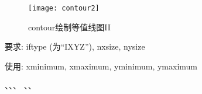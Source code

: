\begin{figure}[H]
\centering
\texttt{[image: contour2]}
\caption{contour绘制等值线图II}
\end{figure}

要求: iftype (为``IXYZ''), nxsize, nysize

使用: xminimum, xmaximum, yminimum, ymaximum

、、、
、、
